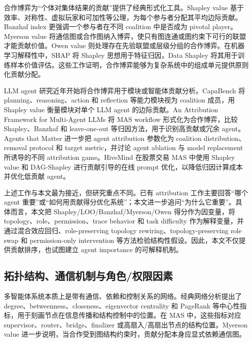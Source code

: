 合作博弈为“个体对集体结果的贡献”提供了经典形式化工具。Shapley value 基于效率、对称性、虚拟玩家和可加性等公理，为每个参与者分配其平均边际贡献\cite{shapley1953value}。Banzhaf index 更强调一个参与者在不同 coalition 中是否成为 pivotal player\cite{banzhaf1965weighted}。Myerson value 将通信图或合作图纳入博弈，使只有图连通或图约束下可行的联盟才能贡献价值\cite{myerson1977graphs}。Owen value 则处理存在先验联盟或层级分组的合作博弈\cite{owen1977values}。在机器学习解释性中，SHAP 将 Shapley 思想用于特征归因\cite{lundberg2017unified}，Data Shapley 将其用于训练样本价值评估\cite{ghorbani2019data}。这些工作证明，合作博弈能够为复杂系统中的组成单元提供原则化贡献分配。

LLM agent 研究近年开始将合作博弈用于模块或智能体贡献分析。CapaBench 将 planning、reasoning、action 和 reflection 等能力模块视为 coalition 成员，用 Shapley value 衡量模块对单个 LLM agent 的边际贡献\cite{yang2025capabench}。An Attribution Framework for Multi-Agent LLMs 将 MAS workflow 形式化为合作博弈，比较 Shapley、Banzhaf 和 leave-one-out 等归因方法，用于识别高贡献或冗余 agent\cite{lu2026attribution}。Agents that Matter 进一步把 agent attribution 参数化为 coalition distribution、removal protocol 和 target metric，并讨论 agent ablation 与 model replacement 所诱导的不同 attribution game\cite{lu2026agents}。HiveMind 在股票交易 MAS 中使用 Shapley value 和 DAG-Shapley 进行贡献引导的在线 prompt 优化，以降低归因计算成本并优化低贡献 agent\cite{xia2026hivemind}。

上述工作与本文最为接近，但研究重点不同。已有 attribution 工作主要回答“哪个 agent 重要”或“如何用贡献得分优化系统”；本文进一步追问“为什么它重要”。具体而言，本文把 Shapley/LOO/Banzhaf/Myerson/Owen 得分作为因变量，将 topology、role、permission、trace behavior 和 task difficulty 作为解释变量，并通过混合效应回归、role-preserving topology rewiring、topology-preserving role swap 和 permission-only intervention 等方法检验结构性假设。因此，本文不仅提供贡献排序，也试图建立 agent importance 的可解释机制。

\subsection{拓扑结构、通信机制与角色/权限因素}

多智能体系统本质上是带有通信、依赖和控制关系的网络。经典网络分析提出了 degree、betweenness、closeness、eigenvector centrality 和 PageRank 等中心性指标，用于刻画节点在信息传播和结构控制中的位置\cite{freeman1977set,bonacich1987power,page1999pagerank,newman2010networks}。在 MAS 中，这些指标对应 supervisor、router、bridge、finalizer 或高扇入/高扇出节点的结构位置。Myerson value 进一步说明，当合作受到图结构约束时，贡献分配本身应显式依赖通信图\cite{myerson1977graphs}。

